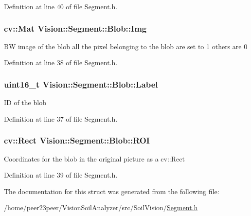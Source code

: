 Definition at line 40 of file Segment.\+h.

\hypertarget{struct_vision_1_1_segment_1_1_blob_a776f587282c775375052461a14b0a304}{}
\subsubsection[{Img}]{\setlength{\rightskip}{0pt plus 5cm}cv\+::\+Mat Vision\+::\+Segment\+::\+Blob\+::\+Img}\label{struct_vision_1_1_segment_1_1_blob_a776f587282c775375052461a14b0a304}
B\+W image of the blob all the pixel belonging to the blob are set to 1 others are 0 

Definition at line 38 of file Segment.\+h.

\hypertarget{struct_vision_1_1_segment_1_1_blob_aaa4c2a0d3f0c920fb8b59417dd54f82b}{}
\subsubsection[{Label}]{\setlength{\rightskip}{0pt plus 5cm}uint16\+\_\+t Vision\+::\+Segment\+::\+Blob\+::\+Label}\label{struct_vision_1_1_segment_1_1_blob_aaa4c2a0d3f0c920fb8b59417dd54f82b}
I\+D of the blob 

Definition at line 37 of file Segment.\+h.

\hypertarget{struct_vision_1_1_segment_1_1_blob_aceb3e938bb4489c08edd9324fdee7465}{}
\subsubsection[{R\+O\+I}]{\setlength{\rightskip}{0pt plus 5cm}cv\+::\+Rect Vision\+::\+Segment\+::\+Blob\+::\+R\+O\+I}\label{struct_vision_1_1_segment_1_1_blob_aceb3e938bb4489c08edd9324fdee7465}
Coordinates for the blob in the original picture as a cv\+::\+Rect 

Definition at line 39 of file Segment.\+h.



The documentation for this struct was generated from the following file\+:\begin{DoxyCompactItemize}
\item 
/home/peer23peer/\+Vision\+Soil\+Analyzer/src/\+Soil\+Vision/\hyperlink{_segment_8h}{Segment.\+h}\end{DoxyCompactItemize}
